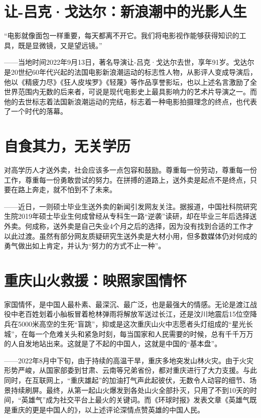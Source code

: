 
\section*{让-吕克·戈达尔：新浪潮中的光影人生}

“电影就像面包一样重要，每天都离不开它。我们将电影视作能够获得知识的工具，既是显微镜，又是望远镜。”

——当地时间2022年9月13日，著名导演让-吕克·戈达尔去世，享年91岁。戈达尔是20世纪60年代兴起的法国电影新浪潮运动的标志性人物，从影评人变成导演后，他以《精疲力尽》《狂人皮埃罗》《轻蔑》等作品享誉影坛，也以上述名言激励了全世界范围内无数的后来者，可说是现代电影史上最具影响力的艺术片导演之一。而他的去世标志着法国新浪潮运动的完结，标志着一种电影拍摄理念的终点，也代表了一个时代的落幕。

\section*{自食其力，无关学历}

对高学历人才送外卖，社会应该多一点包容和鼓励。尊重每一份劳动，尊重每一份工作，尊重每一份勇敢尝试的努力。在拼搏的道路上，送外卖是起点不是终点，只要在路上奔走，就不怕到不了未来。

——近日，一则硕士毕业生送外卖的新闻引发网友关注。据报道，中国社科院研究生院2019年硕士毕业生何成曾经从专科生一路“逆袭”读研，却在毕业三年后选择送外卖。何成称，送外卖是自己失业4个月之后的选择，因为没有找到合适的工作才以此过渡。虽然有部分网友质疑研究生送外卖是大材小用，但多数媒体仍对何成的勇气做出如上肯定，并认为“努力的方式不止一种”。

\clearpage
\section*{重庆山火救援：映照家国情怀}

家国情怀，是中国人最朴素、最深沉、最广泛，也是最强大的情感。无论是渡江战役中老百姓划着小舢板冒着枪林弹雨将解放军送过长江，还是汶川地震后15位空降兵在5000米高空的生死“盲跳”，抑或是这次重庆山火中志愿者头灯组成的“星光长城”，在每一个危难关头和紧急时刻，每当国家和人民需要的时候，总有千千万万的人自发地站出来。这就是了不起的中国人，这就是中国的“基本盘”。

——2022年8月中下旬，由于持续的高温干旱，重庆多地突发山林火灾。由于火灾形势严峻，从国家部委到甘肃、云南等兄弟省份，都对重庆进行了大力支援。与此同时，在互联网上，“重庆雄起”的加油打气声此起彼伏，无数令人动容的细节、场景持续刷屏。最终，从第一起山火爆发到各处山火全部扑灭，只用了不到10天的时间，“英雄气”成为社交平台上最火的关键词。而《环球时报》发表文章《英雄气既是重庆的更是中国人的》，以上述评论深情点赞英雄的中国人民。

